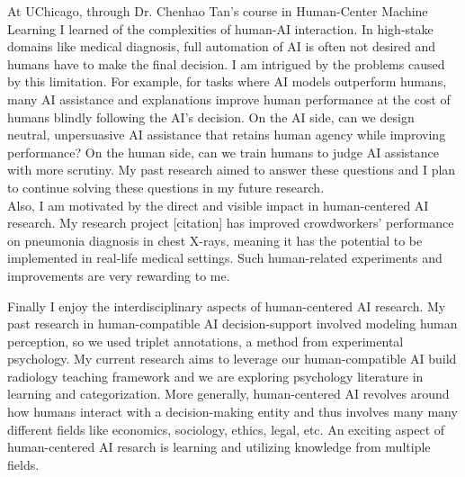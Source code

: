 



At UChicago, through Dr. Chenhao Tan's course in Human-Center Machine Learning I learned of the complexities of human-AI interaction. In high-stake domains like medical diagnosis, full automation of AI is often not desired and humans have to make the final decision. I am intrigued by the problems caused by this limitation. For example, for tasks where AI models outperform humans, many AI assistance and explanations improve human performance at the cost of humans blindly following the AI's decision. On the AI side, can we design neutral, unpersuasive AI assistance that retains human agency while improving performance? On the human side, can we train humans to judge AI assistance with more scrutiny. My past research aimed to answer these questions and I plan to continue solving these questions in my future research.
\\

Also, I am motivated by the direct and visible impact in human-centered AI research. My research project [citation] has improved crowdworkers' performance on pneumonia diagnosis in chest X-rays, meaning it has the potential to be implemented in real-life medical settings. Such human-related experiments and improvements are very rewarding to me.


Finally I enjoy the interdisciplinary aspects of human-centered AI research. 
My past research in human-compatible AI decision-support involved modeling human perception, so we used triplet annotations, a method from experimental psychology. 
My current research aims to leverage our human-compatible AI build radiology teaching framework and we are exploring psychology literature in learning and categorization. 
More generally, human-centered AI revolves around how humans interact with a decision-making entity and thus involves many many different fields like economics, sociology, ethics, legal, etc. 
An exciting aspect of human-centered AI resarch is learning and utilizing knowledge from multiple fields. 
\\





